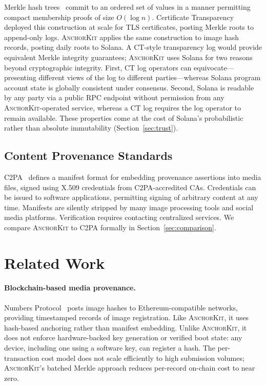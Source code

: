 \documentclass[11pt,a4paper]{article}
\newcommand{\AK}{\textsc{AnchorKit}\xspace}
\begin{document}
Merkle hash trees~\cite{merkle87} commit to an ordered set of values in a
manner permitting compact membership proofs of size $O(\log n)$.  Certificate
Transparency~\cite{ct13} deployed this construction at scale for TLS
certificates, posting Merkle roots to append-only logs.  \AK applies the same
construction to image hash records, posting daily roots to Solana.  A CT-style
transparency log would provide equivalent Merkle integrity guarantees; \AK uses
Solana for two reasons beyond cryptographic integrity.  First, CT log operators
can equivocate---presenting different views of the log to different
parties---whereas Solana program account state is globally consistent under
consensus.  Second, Solana is readable by any party via a public RPC endpoint
without permission from any \AK-operated service, whereas a CT log requires the
log operator to remain available.  These properties come at the cost of Solana's
probabilistic rather than absolute immutability
(Section~\ref{sec:trust}).

\subsection{Content Provenance Standards}
\label{sec:background:c2pa}

C2PA~\cite{c2pa22} defines a manifest format for embedding provenance
assertions into media files, signed using X.509 credentials from C2PA-accredited
CAs.  Credentials can be issued to software applications, permitting signing of
arbitrary content at any time.  Manifests are silently stripped by many image
processing tools and social media platforms.  Verification requires contacting
centralized services.  We compare \AK to C2PA formally in
Section~\ref{sec:comparison}.

\section{Related Work}
\label{sec:related}

\paragraph{Blockchain-based media provenance.}
Numbers Protocol~\cite{numbers22} posts image hashes to Ethereum-compatible
networks, providing timestamped records of image registration.  Like \AK, it
uses hash-based anchoring rather than manifest embedding.  Unlike \AK, it does
not enforce hardware-backed key generation or verified boot state: any device,
including one using a software key, can register a hash.  The per-transaction
cost model does not scale efficiently to high submission volumes; \AK's batched
Merkle approach reduces per-record on-chain cost to near zero.
\end{document}
